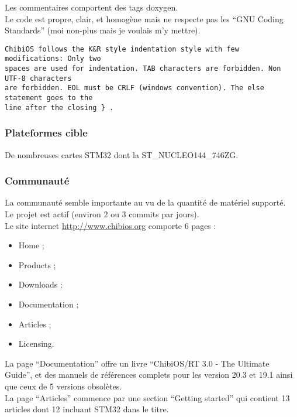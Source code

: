 Les commentaires comportent des tags doxygen.\\

Le code est propre, clair, et homogène mais ne respecte pas les \enquote{GNU Coding
Standards}\cite{ref4} (moi non-plus mais je voulais m'y mettre).\\

\begin{verbatim}
ChibiOS follows the K&R style indentation style with few modifications: Only two
spaces are used for indentation. TAB characters are forbidden. Non UTF-8 characters
are forbidden. EOL must be CRLF (windows convention). The else statement goes to the
line after the closing } .
\end{verbatim}

\subsubsection{Plateformes cible}
De nombreuses cartes STM32 dont la ST\_NUCLEO144\_746ZG.

\subsubsection{Communauté}
La communauté semble importante au vu de la quantité de matériel supporté.\\

Le projet est actif (environ 2 ou 3 commits par jours).\\

Le site internet \url{http://www.chibios.org} comporte 6 pages :
\begin{itemize}
	\item Home ;
	\item Products ;
	\item Downloads ;
	\item Documentation ;
	\item Articles ;
	\item Licensing.\\
\end{itemize}

La page \enquote{Documentation} offre un livre \enquote{ChibiOS/RT 3.0 - The Ultimate
Guide}, et des manuels de références complets pour les version 20.3 et 19.1 ainsi que
ceux de 5 versions obsolètes.\\

La page \enquote{Articles} commence par une section \enquote{Getting started} qui
contient 13 articles dont 12 incluant STM32 dans le titre.\\

